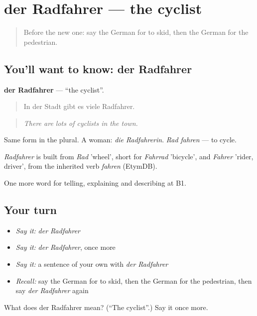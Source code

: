 \section[der Radfahrer]{der Radfahrer — the cyclist}

\label{lesson:GE-C410-radfahrer}



\begin{quote}
Before the new one: say the German for to skid, then the German for the pedestrian.
\end{quote}

\subsection*{You'll want to know: der Radfahrer}
\textbf{der Radfahrer} — \textquotedblleft{}the cyclist\textquotedblright{}.

\begin{quote}
In der Stadt gibt es viele Radfahrer.
\end{quote}

\begin{quote}
\emph{There are lots of cyclists in the town.}
\end{quote}

Same form in the plural. A woman: \emph{die Radfahrerin}. \emph{Rad fahren} — to cycle.

\begin{cousinweb}
\emph{Radfahrer} is built from \emph{Rad} 'wheel', short for \emph{Fahrrad} 'bicycle', and \emph{Fahrer} 'rider, driver', from the inherited verb \emph{fahren} (EtymDB).
\end{cousinweb}

\begin{grammarlens}[title={What you've built}]
One more word for telling, explaining and describing at B1.
\end{grammarlens}

\subsection*{Your turn}
\begin{itemize}
\raggedright
  \item \emph{Say it:} \emph{der Radfahrer}
  \item \emph{Say it:} \emph{der Radfahrer}, once more
  \item \emph{Say it:} a sentence of your own with \emph{der Radfahrer}
  \item \emph{Recall:} say the German for to skid, then the German for the pedestrian, then say \emph{der Radfahrer} again
\end{itemize}

\begin{tcolorbox}[breakable,colback=teal!4,colframe=teal!35!black,title={Before you move on}]
What does der Radfahrer mean? (\textquotedblleft{}The cyclist\textquotedblright{}.) Say it once more.
\end{tcolorbox}
